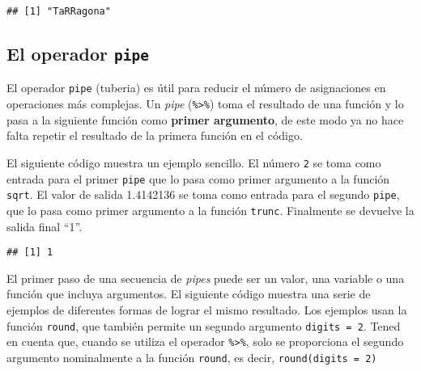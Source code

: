 \documentclass[
]{book}
\newenvironment{Shaded}{\begin{snugshade}}{\end{snugshade}}
\newcommand{\DataTypeTok}[1]{\textcolor[rgb]{0.13,0.29,0.53}{#1}}
\newcommand{\DecValTok}[1]{\textcolor[rgb]{0.00,0.00,0.81}{#1}}
\newcommand{\KeywordTok}[1]{\textcolor[rgb]{0.13,0.29,0.53}{\textbf{#1}}}
\newcommand{\NormalTok}[1]{#1}
\newcommand{\OperatorTok}[1]{\textcolor[rgb]{0.81,0.36,0.00}{\textbf{#1}}}
\newcommand{\StringTok}[1]{\textcolor[rgb]{0.31,0.60,0.02}{#1}}
\begin{document}
\begin{verbatim}
## [1] "TaRRagona"
\end{verbatim}

\hypertarget{el-operador-pipe}{%
\subsection{\texorpdfstring{El operador \texttt{pipe}}{El operador pipe}}\label{el-operador-pipe}}

El operador \texttt{pipe} (tuberia) es útil para reducir el número de asignaciones en operaciones más complejas. Un \emph{pipe} (\texttt{\%\textgreater{}\%}) toma el resultado de una función y lo pasa a la siguiente función como \textbf{primer argumento}, de este modo ya no hace falta repetir el resultado de la primera función en el código.

El siguiente código muestra un ejemplo sencillo. El número \texttt{2} se toma como entrada para el primer \texttt{pipe} que lo pasa como primer argumento a la función \texttt{sqrt}. El valor de salida 1.4142136 se toma como entrada para el segundo \texttt{pipe}, que lo pasa como primer argumento a la función \texttt{trunc}. Finalmente se devuelve la salida final ``1''.

\begin{Shaded}
\end{Shaded}

\begin{verbatim}
## [1] 1
\end{verbatim}

\begin{Shaded}
\end{Shaded}

El primer paso de una secuencia de \emph{pipes} puede ser un valor, una variable o una función que incluya argumentos. El siguiente código muestra una serie de ejemplos de diferentes formas de lograr el mismo resultado. Los ejemplos usan la función \texttt{round}, que también permite un segundo argumento \texttt{digits\ =\ 2}. Tened en cuenta que, cuando se utiliza el operador \texttt{\%\textgreater{}\%}, solo se proporciona el segundo argumento nominalmente a la función \texttt{round}, es decir, \texttt{round(digits\ =\ 2)}
\end{document}
